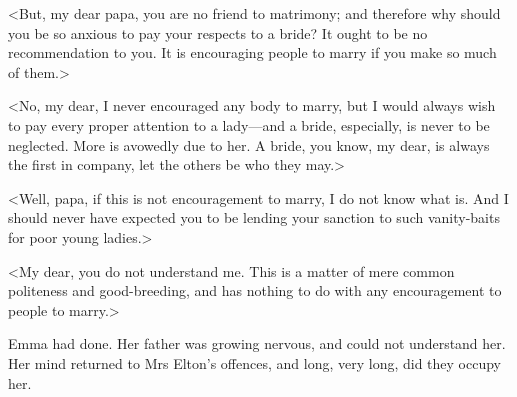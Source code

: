 <But, my dear papa, you are no friend to matrimony; and therefore why should you be so anxious to pay your respects to a bride? It ought to be no recommendation to you. It is encouraging people to marry if you make so much of them.>

<No, my dear, I never encouraged any body to marry, but I would always wish to pay every proper attention to a lady—and a bride, especially, is never to be neglected. More is avowedly due to her. A bride, you know, my dear, is always the first in company, let the others be who they may.>

<Well, papa, if this is not encouragement to marry, I do not know what is. And I should never have expected you to be lending your sanction to such vanity-baits for poor young ladies.>

<My dear, you do not understand me. This is a matter of mere common politeness and good-breeding, and has nothing to do with any encouragement to people to marry.>

Emma had done. Her father was growing nervous, and could not understand her. Her mind returned to Mrs Elton's offences, and long, very long, did they occupy her.